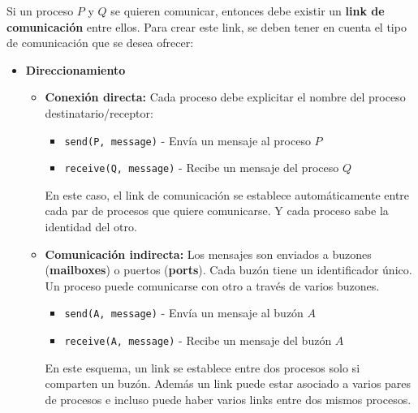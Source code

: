 Si un proceso $P$ y $Q$ se quieren comunicar, entonces debe existir un \textbf{link de comunicación} entre ellos. Para crear este link, se deben tener en cuenta el tipo de comunicación que se desea ofrecer:
\begin{itemize}
    \item \textbf{Direccionamiento}
    \begin{itemize}
        \item \textbf{Conexión directa:} Cada proceso debe explicitar el nombre del proceso destinatario/receptor:
        \begin{itemize}
            \item \texttt{send(P, message)} - Envía un mensaje al proceso $P$
            \item \texttt{receive(Q, message)} - Recibe un mensaje del proceso $Q$
        \end{itemize}

        En este caso, el link de comunicación se establece automáticamente entre cada par de procesos que quiere comunicarse. Y cada proceso sabe la identidad del otro.

        \item \textbf{Comunicación indirecta:} Los mensajes son enviados a buzones (\textbf{mailboxes}) o puertos (\textbf{ports}). Cada buzón tiene un identificador único. Un proceso puede comunicarse con otro a través de varios buzones.
        \begin{itemize}
            \item \texttt{send(A, message)} - Envía un mensaje al buzón $A$
            \item \texttt{receive(A, message)} - Recibe un mensaje del buzón $A$
        \end{itemize}

        En este esquema, un link se establece entre dos procesos solo si comparten un buzón. Además un link puede estar asociado a varios pares de procesos e incluso puede haber varios links entre dos mismos procesos.


\end{itemize}
\end{itemize}
